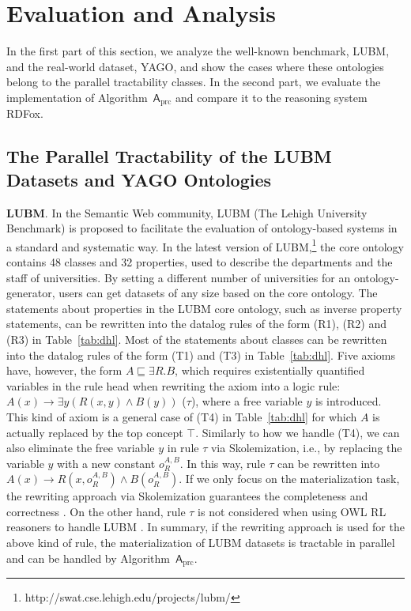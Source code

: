 \section{Evaluation and Analysis}
\label{sec:evaluation}

In the first part of this section, we analyze the well-known benchmark, LUBM, 
and the real-world dataset, YAGO, and
show the cases where these ontologies belong to the parallel tractability classes.
In the second part, we evaluate the implementation of Algorithm~$\mathsf{A}_{\text{prc}}$
and compare it to the reasoning system RDFox.

\subsection{The Parallel Tractability of the LUBM Datasets and YAGO Ontologies}

\textbf{LUBM}. In the Semantic Web community, LUBM
(The Lehigh University Benchmark) is proposed to
facilitate the evaluation of ontology-based systems
in a standard and systematic way.
In the latest version of LUBM,\footnote{http://swat.cse.lehigh.edu/projects/lubm/}
the core ontology contains 48 classes and 32 properties, used to describe the departments and the staff of
universities. By setting a different number of universities for an ontology-generator, users can get datasets of any size based on the core ontology.
%
The statements about properties in the LUBM core ontology, such as inverse property statements,
can be rewritten into the datalog rules of the form (R1), (R2) and (R3) in Table~\ref{tab:dhl}.
Most of the statements about classes can be rewritten into the datalog rules of the form (T1) and (T3)
in Table~\ref{tab:dhl}. Five axioms have, however, the form $A\sqsubseteq\exists R.B$,
which requires existentially quantified variables in the rule head when rewriting
the axiom into a logic rule: $A(x)\rightarrow\exists y(R(x,y)\wedge B(y))$ ($\tau$),
where a free variable $y$ is introduced. This kind of axiom is a general case of (T4) in Table~\ref{tab:dhl}
for which $A$ is actually replaced by the top concept $\top$.
Similarly to how we handle (T4), we can also eliminate the free variable $y$
in rule $\tau$ via Skolemization, i.e., by replacing the variable $y$ with a new constant $o_R^{A,B}$.
In this way, rule $\tau$ can be rewritten into $A(x)\rightarrow R(x,o_R^{A,B})\wedge B(o_R^{A,B})$.
If we only focus on the materialization task, the rewriting approach via Skolemization guarantees the
completeness and correctness \cite{GrauHKKMMW13}.
On the other hand, rule $\tau$ is not considered when using OWL RL reasoners to handle LUBM \cite{UrbaniKMHB12,WeaverH09}.
In summary, if the rewriting approach is used for the above kind of rule,
the materialization of LUBM datasets is tractable in parallel and can be handled by
Algorithm~$\mathsf{A}_{\text{prc}}$.


